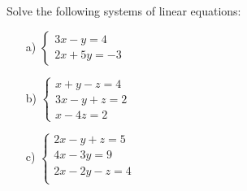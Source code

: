 \bigskip 
\begin{problem}
    Solve the following systems of linear equations:

    \begin{enumerate}
        \item[a) ] $\begin{cases}
            3x-y=4\\
            2x+5y=-3
        \end{cases}$
        
        \item[b) ] $\begin{cases}
            x+y-z=4\\
            3x-y+z=2\\
            x-4z=2
        \end{cases}$
        
        \item[c) ] $\begin{cases}
            2x-y+z=5\\
            4x-3y=9\\
            2x-2y-z=4\\
        \end{cases}$
        
    \end{enumerate}
\end{problem}
\bigskip


        
        
        
